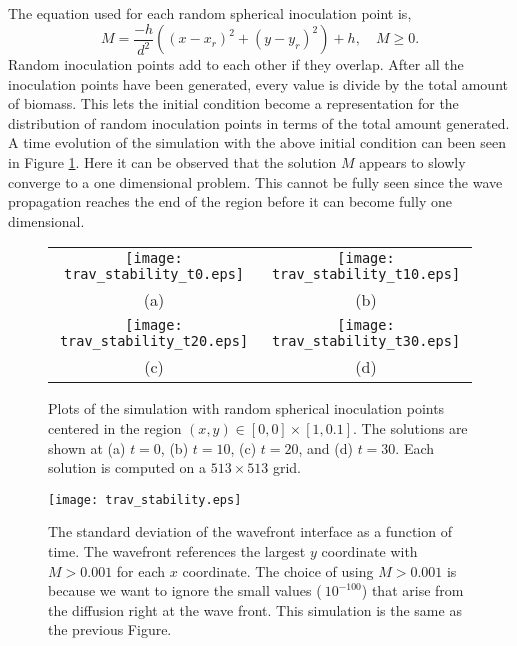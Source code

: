 The equation used for each random spherical inoculation point is,
\begin{equation}
  M = \frac{-h}{d^2} \left( (x - x_r)^2 + (y - y_r)^2 \right) + h, \quad M \ge  0.
\end{equation}
Random inoculation points add to each other if they overlap.
After all the inoculation points have been generated, every value is divide by the total amount of biomass.
This lets the initial condition become a representation for the distribution of random inoculation points in terms of the total amount generated.
A time evolution of the simulation with the above initial condition can been seen in Figure \ref{fig:trav_stability}.
Here it can be observed that the solution $M$ appears to slowly converge to a one dimensional problem.
This cannot be fully seen since the wave propagation reaches the end of the region before it can become fully one dimensional.

\begin{figure}[!htp]
  \centering
  \begin{tabular}{c c}
      \texttt{[image: trav\_stability\_t0.eps]} &
      \texttt{[image: trav\_stability\_t10.eps]} \\
      (a) & (b) \\
      \texttt{[image: trav\_stability\_t20.eps]} &
      \texttt{[image: trav\_stability\_t30.eps]} \\
      (c) & (d) 
  \end{tabular}
  \caption{Plots of the simulation with random spherical inoculation points centered in the region $(x,y) \in [0,0] \times [1,0.1]$.
    The solutions are shown at (a) $t = 0$, (b) $t = 10$, (c) $t = 20$, and (d) $t = 30$.
    Each solution is computed on a $513 \times 513$ grid. }
  \label{fig:trav_stability}
\end{figure}

\begin{figure}[!htp]
  \centering
  \texttt{[image: trav\_stability.eps]}
  \caption{The standard deviation of the wavefront interface as a function of time.
    The wavefront references the largest $y$ coordinate with $M > 0.001$ for each $x$ coordinate.
    The choice of using $M > 0.001$ is because we want to ignore the small values ($~10^{-100}$) that arise from the diffusion right at the wave front. 
    This simulation is the same as the previous Figure.  }
  \label{fig:trav_stability_stddev}
\end{figure}

